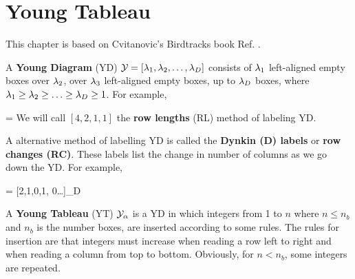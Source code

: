 \chapter{Young Tableau}
\label{ch-young-tableau}

This chapter is based on Cvitanovic's Birdtracks book Ref. \cite{birdtracks-book}.

A {\bf Young Diagram} (YD) ${\cal Y}=[\lambda_1, \lambda_2, \ldots, \lambda_D]$ 
consists of $\lambda_1$ left-aligned empty boxes
over $\lambda_2$, over 
$\lambda_3$ left-aligned empty boxes, up to
$\lambda_D$ boxes,
where $\lambda_1\geq \lambda_2\geq \ldots\geq \lambda_D\geq 1$.
For example,

\beq
[4, 2,1,1]=
\eeq
We will call $[4, 2,1,1]$ the
{\bf row lengths} (RL) method 
of labeling YD.

A alternative method of labelling YD is called the {\bf Dynkin (D) labels} 
or {\bf row changes (RC)}.
These labels list the change in number of columns as 
we go down the YD.
For example,

\beq
{}
=
[2,1,0,1, 0\ldots]_{D}
\eeq



A {\bf Young Tableau} (YT)
${\cal Y}_\alpha$ is a YD in which integers from 1 to $n$ where $n\leq n_b$ and $n_b$ is the number boxes, are inserted according to some rules. The rules for insertion are that integers must increase when reading a row  left to right and
when reading a column from top to bottom. Obviously, for $n<n_b$, some integers are repeated.

